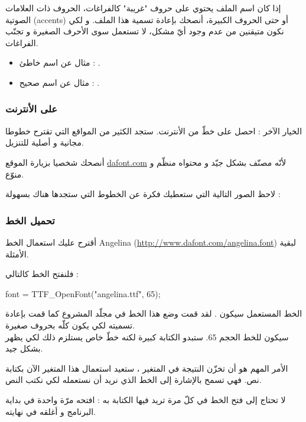 إذا كان اسم الملف يحتوي على حروف "غريبة" كالفراغات، الحروف ذات العلامات الصوتية 
(\textenglish{accents})
أو حتى الحروف الكبيرة، أنصحك بإعادة تسمية هذا الملف. و لكي نكون متيقنين من عدم وجود أيّ مشكل، لا تستعمل سوى الأحرف الصغيرة و تجنّب الفراغات.

\begin{itemize}
	\item مثال عن اسم خاطئ : 
	.
	\item مثال عن اسم صحيح :
	.
\end{itemize}

\subsubsection{على الأنترنت}

الخيار الآخر : احصل على خطّ من الأنترنت. ستجد الكثير من المواقع التي تقترح خطوطا مجانية و أصلية للتنزيل.

أنصحك شخصيا بزيارة الموقع
\href{http://www.dafont.com/}{\textenglish{dafont.com}}
لأنّه مصنّف بشكل جيّد و محتواه منظّم و منوّع.

لاحظ الصور التالية التي ستعطيك فكرة عن الخطوط التي ستجدها هناك بسهولة :


\subsubsection{تحميل الخط}

 أقترح عليك استعمال الخط 
\textenglish{Angelina} (\url{http://www.dafont.com/angelina.font})
 لبقية الأمثلة.

فلنفتح الخط كالتالي  :

\begin{Csource}
font = TTF_OpenFont("angelina.ttf", 65);
\end{Csource}

الخط المستعمل سيكون
.
لقد قمت وضع هذا الخط في مجلّد المشروع كما قمت بإعادة تسميته لكي يكون كلّه بحروف صغيرة.\\
سيكون للخط الحجم 65. ستبدو الكتابة كبيرة لكنه خطّ خاص يستلزم ذلك لكي يظهر بشكل جيد.

الأمر المهم هو أن
تخزّن النتيجة في المتغير
،
ستعيد استعمال هذا المتغير الآن بكتابة نص. فهي تسمح بالإشارة إلى الخط الذي نريد أن نستعمله لكي نكتب النص.

\begin{information}
لا تحتاج إلى فتح الخط في كلّ مرة تريد فيها الكتابة به : افتحه مرّة واحدة في بداية البرنامج و أغلقه في نهايته.
\end{information}

